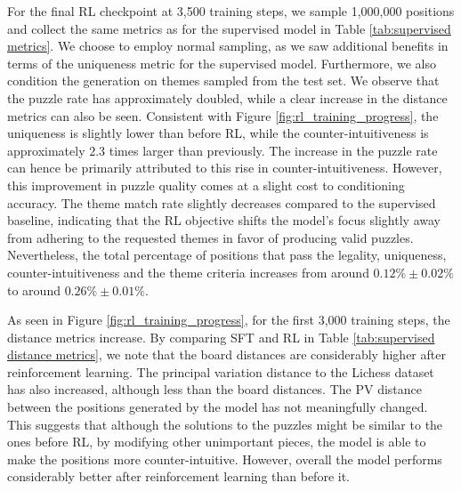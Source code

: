 For the final RL checkpoint at 3,500 training steps, we sample 1,000,000 positions and collect the same metrics as for the supervised model in Table \ref{tab:supervised metrics}. We choose to employ normal sampling, as we saw additional benefits in terms of the uniqueness metric for the supervised model. Furthermore, we also condition the generation on themes sampled from the test set. We observe that the puzzle rate has approximately doubled, while a clear increase in the distance metrics can also be seen. Consistent with Figure \ref{fig:rl_training_progress}, the uniqueness is slightly lower than before RL, while the counter-intuitiveness is approximately $2.3$ times larger than previously. The increase in the puzzle rate can hence be primarily attributed to this rise in counter-intuitiveness. However, this improvement in puzzle quality comes at a slight cost to conditioning accuracy. The theme match rate slightly decreases compared to the supervised baseline, indicating that the RL objective shifts the model's focus slightly away from adhering to the requested themes in favor of producing valid puzzles. Nevertheless, the total percentage of positions that pass the legality, uniqueness, counter-intuitiveness and the theme criteria increases from around $0.12\%\pm 0.02\%$ to around $0.26\%\pm 0.01\%$.

As seen in Figure \ref{fig:rl_training_progress}, for the first 3,000 training steps, the distance metrics increase. By comparing SFT and RL in Table \ref{tab:supervised distance metrics}, we note that the board distances are considerably higher after reinforcement learning. The principal variation distance to the Lichess dataset has also increased, although less than the board distances. The PV distance between the positions generated by the model has not meaningfully changed. This suggests that although the solutions to the puzzles might be similar to the ones before RL, by modifying other unimportant pieces, the model is able to make the positions more counter-intuitive. However, overall the model performs considerably better after reinforcement learning than before it.




